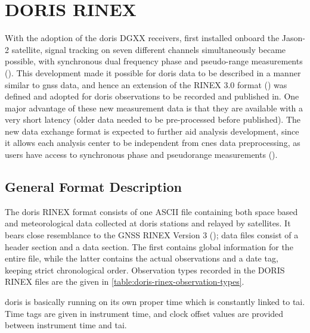 \section{DORIS RINEX}\label{sec:doris-rinex}
With the adoption of the \gls{doris} DGXX receivers, first installed onboard the 
Jason-2 satellite, signal tracking on seven different channels simultaneously became 
possible, with synchronous dual frequency phase and pseudo-range measurements 
(\cite{Mercier2010}). This development made it possible for \gls{doris} data to 
be described in a manner similar to \gls{gnss} data, and hence an extension of the 
RINEX 3.0 format (\cite{RINEX305}) was defined and adopted for \gls{doris} observations to be 
recorded and published in. One major advantage of these new measurement data is 
that they are available with a very short latency (older data needed to be pre-processed 
before published). The new data exchange format is expected to further aid analysis 
development, since it allows each analysis center to be independent from \gls{cnes}
data preprocessing, as users have access to synchronous phase and 
pseudorange measurements (\cite{Cerri2011}).

\subsection{General Format Description}
The \gls{doris} RINEX format consists of one ASCII file containing both space based 
and meteorological data collected at \gls{doris} stations and relayed by satellites.
It bears close resemblance to the GNSS RINEX Version 3 (\cite{RINEX305});
data files consist of a header section and a data section. The first contains 
global information for the entire file, while the latter contains the actual 
observations and a date tag, keeping strict chronological order.
Observation types recorded in the DORIS RINEX files are the given in 
\autoref{table:doris-rinex-observation-types}.

\gls{doris} is basically running on its own proper time which is constantly linked 
to \gls{tai}. Time tags are given in instrument time, and clock offset values are 
provided between instrument time and \gls{tai}.

